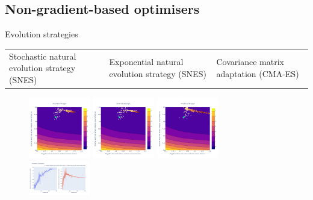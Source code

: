 \documentclass[aspectratio=169]{beamer}
\begin{document}
\subsection{Non-gradient-based optimisers}
\begin{frame}{Evolution strategies}
    \vspace{-5mm}
    \begin{table}[]
        \centering
        \footnotesize
    \begin{tabularx}{0.86\textwidth}{*{3}{Y}}
         Stochastic natural evolution strategy (SNES) &
         Exponential natural evolution strategy (SNES) &
         Covariance matrix adaptation (CMA-ES)
    \end{tabularx}
    \end{table}

    \vspace{-5mm}
    \begin{figure}
        \centering
        \includegraphics[width=0.24\textwidth]{Images/Optimisers/snes_cost.png}
        \includegraphics[width=0.24\textwidth]{Images/Optimisers/xnes_cost.png}
        \includegraphics[width=0.24\textwidth]{Images/Optimisers/cmaes_cost.png} ~~~\\
        \includegraphics[width=0.24\textwidth]{Images/Optimisers/snes_params.png}

\end{figure}
\end{frame}
\end{document}
